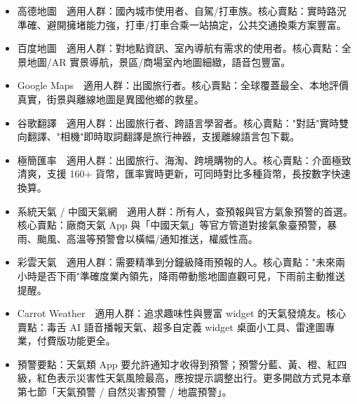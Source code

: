 
\begin{itemize}
  \item 高德地圖　適用人群：國內城市使用者、自駕/打車族。核心賣點：實時路況準確、避開擁堵能力強，打車/打車合乘一站搞定，公共交通換乘方案豐富。
  \item 百度地圖　適用人群：對地點資訊、室內導航有需求的使用者。核心賣點：全景地圖/AR 實景導航，景區/商場室內地圖細緻，語音包豐富。
  \item Google Maps　適用人群：出國旅行者。核心賣點：全球覆蓋最全、本地評價真實，街景與離線地圖是異國他鄉的救星。
\end{itemize}


\begin{itemize}
  \item 谷歌翻譯　適用人群：出國旅行者、跨語言學習者。核心賣點："對話"實時雙向翻譯、"相機"即時取詞翻譯是旅行神器，支援離線語言包下載。
\end{itemize}


\begin{itemize}
  \item 極簡匯率　適用人群：出國旅行、海淘、跨境購物的人。核心賣點：介面極致清爽，支援 160+ 貨幣，匯率實時更新，可同時對比多種貨幣，長按數字快速換算。
\end{itemize}


\begin{itemize}
  \item 系統天氣 / 中國天氣網　適用人群：所有人，查預報與官方氣象預警的首選。核心賣點：廠商天氣 App 與「中國天氣」等官方管道對接氣象臺預警，暴雨、颱風、高溫等預警會以橫幅/通知推送，權威性高。
  \item 彩雲天氣　適用人群：需要精準到分鐘級降雨預報的人。核心賣點："未來兩小時是否下雨"準確度業內領先，降雨帶動態地圖直觀可見，下雨前主動推送提醒。
  \item Carrot Weather　適用人群：追求趣味性與豐富 widget 的天氣發燒友。核心賣點：毒舌 AI 語音播報天氣、超多自定義 widget 桌面小工具、雷達圖專業，付費版功能更全。
  \item 預警要點：天氣類 App 要允許通知才收得到預警；預警分藍、黃、橙、紅四級，紅色表示災害性天氣風險最高，應按提示調整出行。更多開啟方式見本章第七節「天氣預警 / 自然災害預警 / 地震預警」。
\end{itemize}



